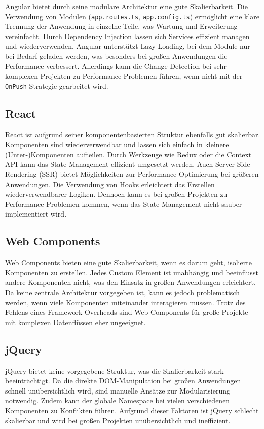 \documentclass[oneside]{ausarbeitung}
\begin{document}
Angular bietet durch seine modulare Architektur eine gute Skalierbarkeit. Die Verwendung von Modulen (\texttt{app.routes.ts}, \texttt{app.config.ts}) ermöglicht eine klare Trennung der Anwendung in einzelne Teile, was Wartung und Erweiterung vereinfacht. Durch Dependency Injection lassen sich Services effizient managen und wiederverwenden. Angular unterstützt Lazy Loading, bei dem Module nur bei Bedarf geladen werden, was besonders bei großen Anwendungen die Performance verbessert. Allerdings kann die Change Detection bei sehr komplexen Projekten zu Performance-Problemen führen, wenn nicht mit der \texttt{OnPush}-Strategie gearbeitet wird.

\subsection{React}

React ist aufgrund seiner komponentenbasierten Struktur ebenfalls gut skalierbar. Komponenten sind wiederverwendbar und lassen sich einfach in kleinere (Unter-)Komponenten aufteilen. Durch Werkzeuge wie Redux oder die Context API kann das State Management effizient umgesetzt werden. Auch Server-Side Rendering (SSR) bietet Möglichkeiten zur Performance-Optimierung bei größeren Anwendungen. Die Verwendung von Hooks erleichtert das Erstellen wiederverwendbarer Logiken. Dennoch kann es bei großen Projekten zu Performance-Problemen kommen, wenn das State Management nicht sauber implementiert wird.

\subsection{Web Components}

Web Components bieten eine gute Skalierbarkeit, wenn es darum geht, isolierte Komponenten zu erstellen. Jedes Custom Element ist unabhängig und beeinflusst andere Komponenten nicht, was den Einsatz in großen Anwendungen erleichtert. Da keine zentrale Architektur vorgegeben ist, kann es jedoch problematisch werden, wenn viele Komponenten miteinander interagieren müssen. Trotz des Fehlens eines Framework-Overheads sind Web Components für große Projekte mit komplexen Datenflüssen eher ungeeignet.

\subsection{jQuery}

jQuery bietet keine vorgegebene Struktur, was die Skalierbarkeit stark beeinträchtigt. Da die direkte DOM-Manipulation bei großen Anwendungen schnell unübersichtlich wird, sind manuelle Ansätze zur Modularisierung notwendig. Zudem kann der globale Namespace bei vielen verschiedenen Komponenten zu Konflikten führen. Aufgrund dieser Faktoren ist jQuery schlecht skalierbar und wird bei großen Projekten unübersichtlich und ineffizient.
\end{document}
